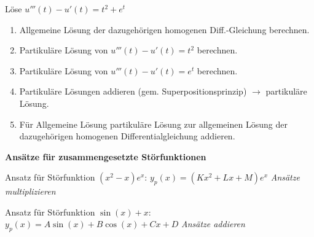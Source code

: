 \begin{exercise}
    Löse $u'''(t)-u'(t)=t^2 + e^t$

    \begin{enumerate}
        \item Allgemeine Lösung der dazugehörigen homogenen Diff.-Gleichung berechnen.
        \item Partikuläre Lösung von $u'''(t)-u'(t)=t^2$ berechnen.
        \item Partikuläre Lösung von $u'''(t)-u'(t)=e^t$ berechnen.
        \item Partikuläre Lösungen addieren (gem. Superpositionsprinzip) $\to$ partikuläre Lösung.
        \item Für Allgemeine Lösung partikuläre Lösung zur allgemeinen Lösung der dazugehörigen homogenen Differentialgleichung addieren.
    \end{enumerate}
\end{exercise}


\begin{exercise}
    \textbf{Ansätze für zusammengesetzte Störfunktionen}
    
    Ansatz für Störfunktion $(x^2-x)e^x$: 
    $y_p(x)=(Kx^2 + Lx + M)e^x$
    \textit{Ansätze multiplizieren}

    Ansatz für Störfunktion $\sin(x)+x$:
    $y_p(x)=A\sin(x)+B\cos(x)+Cx+D$
    \textit{Ansätze addieren}
\end{exercise}